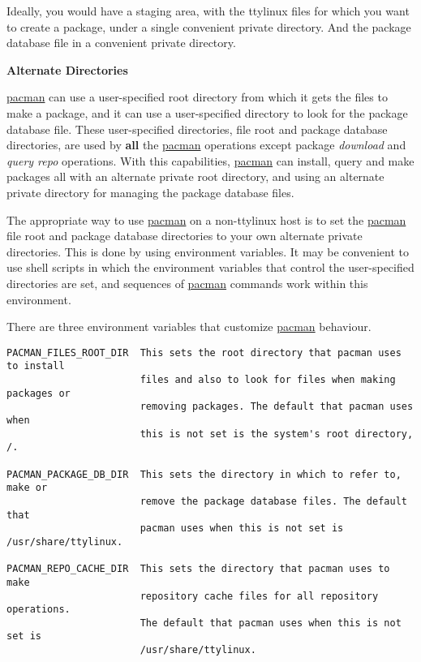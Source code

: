 \documentclass[10pt]{article}
\begin{document}
Ideally, you would have a staging area, with the ttylinux files for which you
want to create a package, under a single convenient private directory. And
the package database file in a convenient private directory.

{\bf Alternate Directories}

\url{pacman} can use a user-specified root directory from which it gets the
files to make a package, and it can use a user-specified directory to look for
the package database file. These user-specified directories, file root and
package database directories, are used by {\bf all} the \url{pacman} operations
except package {\it download} and {\it query repo} operations. With this
capabilities, \url{pacman} can install, query and make packages all with an
alternate private root directory, and using an alternate private directory for
managing the package database files.

The appropriate way to use \url{pacman} on a non-ttylinux host is to set the
\url{pacman} file root and package database directories to your own alternate
private directories. This is done by using environment variables. It may be
convenient to use shell scripts in which the environment variables that
control the user-specified directories are set, and sequences of \url{pacman}
commands work within this environment.

There are three environment variables that customize \url{pacman} behaviour.

\begin{lstlisting}
PACMAN_FILES_ROOT_DIR  This sets the root directory that pacman uses to install
                       files and also to look for files when making packages or
                       removing packages. The default that pacman uses when
                       this is not set is the system's root directory, /.

PACMAN_PACKAGE_DB_DIR  This sets the directory in which to refer to, make or
                       remove the package database files. The default that
                       pacman uses when this is not set is /usr/share/ttylinux.

PACMAN_REPO_CACHE_DIR  This sets the directory that pacman uses to make
                       repository cache files for all repository operations.
                       The default that pacman uses when this is not set is
                       /usr/share/ttylinux.
\end{lstlisting}
\end{document}
